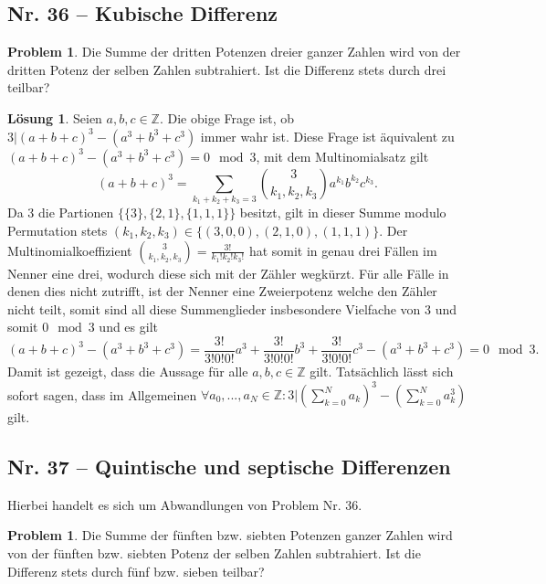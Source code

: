 \documentclass{article}
\theoremstyle{plain} %
\theoremstyle{definition} %
\newtheorem{problem}[theorem]{Problem}
\newtheorem{solution}[theorem]{Lösung}
\begin{document}
\subsection{Nr. 36 -- Kubische Differenz}

\begin{problem}
Die Summe der dritten Potenzen dreier ganzer Zahlen wird von der dritten Potenz der selben Zahlen subtrahiert. Ist die Differenz stets durch drei teilbar?
\end{problem}

\begin{solution}
  Seien $a,b,c \in \mathbb{Z}$. Die obige Frage ist, ob $3 | (a+b+c)^3 - (a^3+b^3+c^3)$ immer wahr ist. Diese Frage ist äquivalent zu $(a+b+c)^3 - (a^3+b^3+c^3) = 0 \mod{3}$, mit dem Multinomialsatz gilt $$(a+b+c)^3 = \sum_{k_1+k_2+k_3 = 3} \binom{3}{k_1, k_2, k_3} a^{k_1} b^{k_2} c^{k_3}.$$
  Da 3 die Partionen $\{\{3\}, \{2,1\}, \{1,1,1\}\}$ besitzt, gilt in dieser Summe modulo Permutation stets $(k_1, k_2, k_3) \in \{(3,0,0), (2,1,0), (1,1,1)\}$. Der Multinomialkoeffizient $\binom{3}{k_1, k_2, k_3} = \frac{3!}{k_1! k_2! k_3!}$ hat somit in genau drei Fällen im Nenner eine drei, wodurch diese sich mit der Zähler wegkürzt. Für alle Fälle in denen dies nicht zutrifft, ist der Nenner eine Zweierpotenz welche den Zähler nicht teilt, somit sind all diese Summenglieder insbesondere Vielfache von 3 und somit $0 \mod{3}$ und es gilt
  $$
    (a+b+c)^3 - (a^3+b^3+c^3) = \frac{3!}{3!0!0!}a^3 + \frac{3!}{3!0!0!}b^3 + \frac{3!}{3!0!0!}c^3 - (a^3+b^3+c^3) = 0 \mod{3}.
  $$
  Damit ist gezeigt, dass die Aussage für alle $a,b,c \in \mathbb{Z}$ gilt. Tatsächlich lässt sich sofort sagen, dass im Allgemeinen $\forall a_0,...,a_N \in \mathbb{Z} : 3 | (\sum_{k=0}^N a_k)^3 - (\sum_{k=0}^N a_k^3)$ gilt.
\end{solution}

\subsection{Nr. 37 -- Quintische und septische Differenzen}

Hierbei handelt es sich um Abwandlungen von Problem Nr. 36.

\begin{problem}
Die Summe der fünften bzw. siebten Potenzen ganzer Zahlen wird von der fünften bzw. siebten Potenz der selben Zahlen subtrahiert. Ist die Differenz stets durch fünf bzw. sieben teilbar?
\end{problem}
\end{document}

